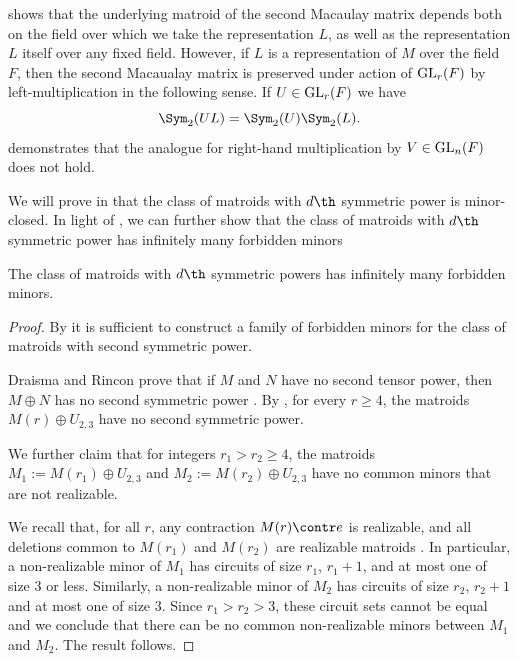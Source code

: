 \begin{remark}
 shows that the underlying matroid of the second Macaulay matrix depends both on the field over which we take the representation $L$, as well as the representation $L$ itself over any fixed field. However, if $L$ is a representation of $M$ over the field $F$, then the second Macaualay matrix is preserved under action of $\operatorname{GL}_r(F)$ by left-multiplication in the following sense. If $U\in \operatorname{GL}_r(F)$ we have
    $$\Sym_2(UL) = \Sym_2(U)\Sym_2(L).$$
 demonstrates that the analogue for right-hand multiplication by $V\in \operatorname{GL}_n(F)$ does not hold.
\end{remark}

We will prove in  that the class of matroids with $d\th$ symmetric power is minor-closed. In light of , we can further show that the class of matroids with $d\th$ symmetric power has infinitely many forbidden minors
\begin{theorem}\label{thm:sympowForbiddenMinors}
    The class of matroids with $d\th$ symmetric powers has infinitely many forbidden minors.
\end{theorem}
\begin{proof}
    By  it is sufficient to construct a family of forbidden minors for the class of matroids with second symmetric power. 

    Draisma and Rincon prove that if $M$ and $N$ have no second tensor power, then $M\oplus N$ has no second symmetric power \cite{DR19}. By , for every $r\geq 4$, the matroids $M(r)\oplus U_{2,3}$ have no second symmetric power.

    We further claim that for integers $r_1>r_2\geq 4$, the matroids $M_1:=M(r_1)\oplus U_{2,3}$ and $M_2:=M(r_2)\oplus U_{2,3}$ have no common minors that are not realizable.
    
    We recall that, for all $r$, any contraction $M(r)\contr e$ is realizable, and all deletions common to $M(r_1)$ and $M(r_2)$ are realizable matroids \cite{Lind88}. In particular, a non-realizable minor of $M_1$ has circuits of size $r_1$, $r_1+1$, and at most one of size $3$ or less. Similarly, a non-realizable minor of $M_2$ has circuits of size $r_2$, $r_2+1$ and at most one of size $3$. Since $r_1>r_2>3$, these circuit sets cannot be equal and we conclude that there can be no common non-realizable minors between $M_1$ and $M_2$. The result follows.
\end{proof}

